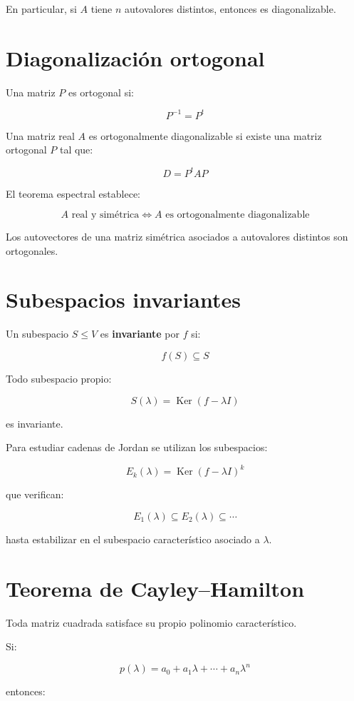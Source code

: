 \documentclass[11pt,a4paper]{article}
\newcommand{\Ker}{\operatorname{Ker}}
\begin{document}
En particular, si $A$ tiene $n$ autovalores distintos, entonces es diagonalizable.

\section{Diagonalización ortogonal}

Una matriz $P$ es ortogonal si:

\[
P^{-1}=P^t
\]

Una matriz real $A$ es ortogonalmente diagonalizable si existe una matriz ortogonal $P$ tal que:

\[
\boxed{
D=P^tAP
}
\]

El teorema espectral establece:

\[
\boxed{
A\text{ real y simétrica}
\iff
A\text{ es ortogonalmente diagonalizable}
}
\]

Los autovectores de una matriz simétrica asociados a autovalores distintos son ortogonales.

\section{Subespacios invariantes}

Un subespacio $S\leq V$ es \textbf{invariante} por $f$ si:

\[
\boxed{
f(S)\subseteq S
}
\]

Todo subespacio propio:

\[
S(\lambda)=\Ker(f-\lambda I)
\]

es invariante.

Para estudiar cadenas de Jordan se utilizan los subespacios:

\[
\boxed{
E_k(\lambda)=\Ker(f-\lambda I)^k
}
\]

que verifican:

\[
E_1(\lambda)\subseteq
E_2(\lambda)\subseteq
\cdots
\]

hasta estabilizar en el subespacio característico asociado a $\lambda$.

\section{Teorema de Cayley--Hamilton}

Toda matriz cuadrada satisface su propio polinomio característico.

Si:

\[
p(\lambda)
=
a_0+a_1\lambda+\cdots+a_n\lambda^n
\]

entonces:
\end{document}
